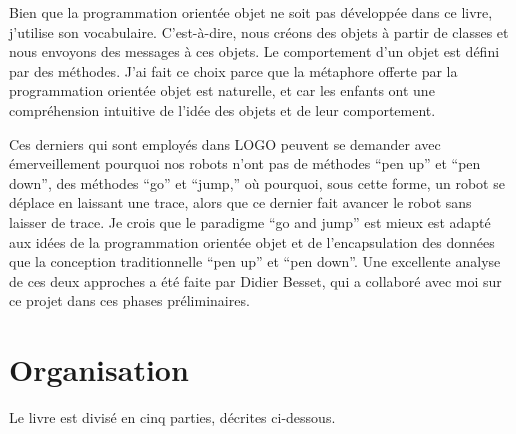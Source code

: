 \documentclass[a4paper,10pt,twoside]{book}
\begin{document}
Bien que la programmation orient\'ee objet ne soit pas d\'evelopp\'ee dans ce livre, j'utilise son vocabulaire. C'est-\`a-dire, nous cr\'eons des objets \`a partir de classes et nous  envoyons des messages \`a ces objets. Le comportement d'un objet est d\'efini par des m\'ethodes. J'ai fait ce choix parce que la m\'etaphore offerte par la programmation orient\'ee objet est naturelle, et car les enfants ont une compr\'ehension intuitive de l'id\'ee des objets et de leur comportement.

Ces derniers qui sont employ\'es dans LOGO peuvent se demander avec \'emerveillement pourquoi nos robots n'ont pas de m\'ethodes ``pen up'' et ``pen down'', des m\'ethodes ``go'' et ``jump,'' o\`u pourquoi, sous cette forme, un robot se d\'eplace en laissant une trace, alors que ce dernier fait avancer le robot sans laisser de trace. Je crois que le paradigme ``go and 
jump''  est mieux est adapt\'e aux id\'ees de la programmation orient\'ee objet et de l'encapsulation des donn\'ees que la conception traditionnelle  ``pen up'' et ``pen down''. Une excellente analyse de ces deux approches a \'et\'e faite par Didier Besset, qui a collabor\'e avec moi sur ce projet dans ces phases pr\'eliminaires.

\section*{Organisation}


Le livre est divis\'e en cinq parties, d\'ecrites  ci-dessous.
\end{document}
